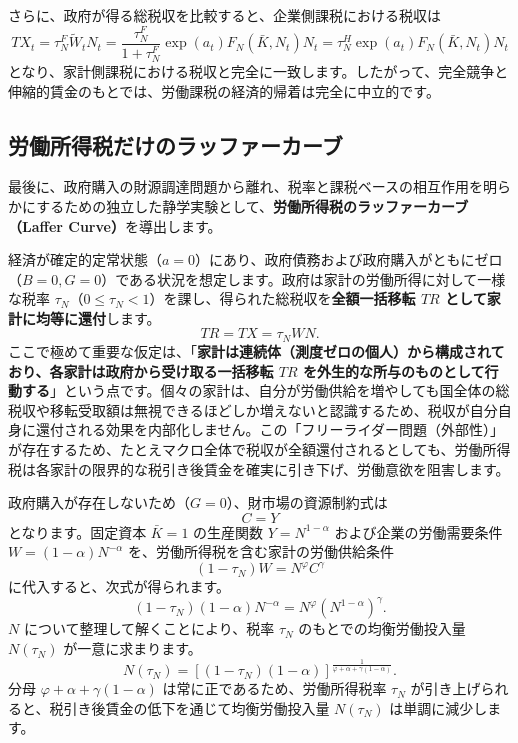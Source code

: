 \documentclass[
  japanese,
  lualatex,
  ja=standard,
  12pt,
  a4paper]{ltjsarticle}
\begin{document}
さらに、政府が得る総税収を比較すると、企業側課税における税収は \[
TX_t = \tau_N^F \widetilde{W}_t N_t = \frac{\tau_N^F}{1+\tau_N^F} \exp(a_t) F_N(\bar{K}, N_t) N_t = \tau_N^H \exp(a_t) F_N(\bar{K}, N_t) N_t
\]
となり、家計側課税における税収と完全に一致します。したがって、完全競争と伸縮的賃金のもとでは、労働課税の経済的帰着は完全に中立的です。

\subsection{労働所得税だけのラッファーカーブ}\label{ux52b4ux50cdux6240ux5f97ux7a0eux3060ux3051ux306eux30e9ux30c3ux30d5ux30a1ux30fcux30abux30fcux30d6}

最後に、政府購入の財源調達問題から離れ、税率と課税ベースの相互作用を明らかにするための独立した静学実験として、\textbf{労働所得税のラッファーカーブ（Laffer
Curve）}を導出します。

経済が確定的定常状態（\(a=0\)）にあり、政府債務および政府購入がともにゼロ（\(B = 0, G = 0\)）である状況を想定します。政府は家計の労働所得に対して一様な税率
\(\tau_N\)（\(0 \leq \tau_N < 1\)）を課し、得られた総税収を\textbf{全額一括移転
\(TR\) として家計に均等に還付}します。 \[
TR = TX = \tau_N W N.
\]
ここで極めて重要な仮定は、「\textbf{家計は連続体（測度ゼロの個人）から構成されており、各家計は政府から受け取る一括移転
\(TR\)
を外生的な所与のものとして行動する}」という点です。個々の家計は、自分が労働供給を増やしても国全体の総税収や移転受取額は無視できるほどしか増えないと認識するため、税収が自分自身に還付される効果を内部化しません。この「フリーライダー問題（外部性）」が存在するため、たとえマクロ全体で税収が全額還付されるとしても、労働所得税は各家計の限界的な税引き後賃金を確実に引き下げ、労働意欲を阻害します。

政府購入が存在しないため（\(G=0\)）、財市場の資源制約式は \[
C = Y
\] となります。固定資本 \(\bar{K}=1\) の生産関数 \(Y = N^{1-\alpha}\)
および企業の労働需要条件 \(W = (1-\alpha)N^{-\alpha}\)
を、労働所得税を含む家計の労働供給条件 \[
(1-\tau_N) W = N^\varphi C^\gamma
\] に代入すると、次式が得られます。 \[
(1-\tau_N) (1-\alpha) N^{-\alpha} = N^\varphi \left( N^{1-\alpha} \right)^\gamma.
\] \(N\) について整理して解くことにより、税率 \(\tau_N\)
のもとでの均衡労働投入量 \(N(\tau_N)\) が一意に求まります。 \[
N(\tau_N) = \left[ (1-\tau_N)(1-\alpha) \right]^{\frac{1}{\varphi + \alpha + \gamma(1-\alpha)}}.
\] 分母 \(\varphi + \alpha + \gamma(1-\alpha)\)
は常に正であるため、労働所得税率 \(\tau_N\)
が引き上げられると、税引き後賃金の低下を通じて均衡労働投入量
\(N(\tau_N)\) は単調に減少します。
\end{document}
